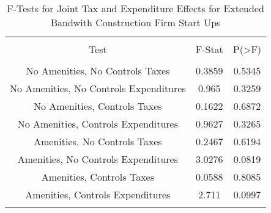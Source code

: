 
\begin{table}[!htbp] \centering 
  \caption{F-Tests for Joint Tax and Expenditure Effects for Extended Bandwith Construction Firm Start Ups} 
  \label{23Ftests} 
\begin{tabular}{@{\extracolsep{5pt}} ccc} 
\\[-1.8ex]\hline 
\hline \\[-1.8ex] 
Test & F-Stat & P(\textgreater F) \\ 
\hline \\[-1.8ex] 
No Amenities, No Controls Taxes & 0.3859 & 0.5345 \\ 
No Amenities, No Controls Expenditures & 0.965 & 0.3259 \\ 
No Amenities, Controls Taxes & 0.1622 & 0.6872 \\ 
No Amenities, Controls Expenditures & 0.9627 & 0.3265 \\ 
Amenities, No Controls Taxes & 0.2467 & 0.6194 \\ 
Amenities, No Controls Expenditures & 3.0276 & 0.0819 \\ 
Amenities, Controls Taxes & 0.0588 & 0.8085 \\ 
Amenities, Controls Expenditures & 2.711 & 0.0997 \\ 
\hline \\[-1.8ex] 
\end{tabular} 
\end{table} 
